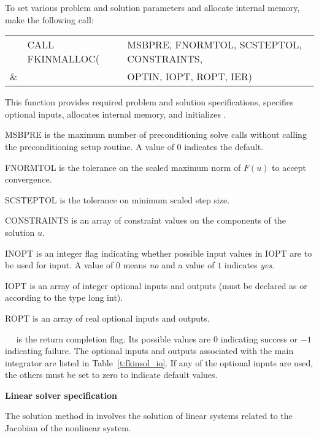 \begin{Steps}
  To set various problem and solution parameters and allocate
  internal memory, make the following call:
  {
    \begin{tabular}[t]{@{}r@{}l@{}l@{}}
      &CALL FKINMALLOC(&MSBPRE, FNORMTOL, SCSTEPTOL, CONSTRAINTS, \\
    {\&}&                &OPTIN, IOPT, ROPT, IER)
    \end{tabular}
  }
  {
    This function provides required problem and solution specifications, 
    specifies optional inputs,
    allocates internal memory, and initializes {\kinsol}.
  }
  {
    \begin{args}[CONSTRAINTS\,]
    \item[MSBPRE] is the maximum number of preconditioning solve calls
      without calling the preconditioning setup routine.
      A value of $0$ indicates the default.
    \item[FNORMTOL] is the tolerance on the scaled maximum norm of
      $F(u)$ to accept convergence. 
    \item[SCSTEPTOL] is the tolerance on minimum scaled step size.
    \item[CONSTRAINTS] is an array of constraint values on the components of the
      solution $u$.
    \item[INOPT] is an integer flag indicating whether possible
      input values in IOPT are to be used for input. A value of
      $0$ means {\em no} and a value of $1$ indicates {\em yes}.
    \item[IOPT] is an array of integer optional inputs and outputs
      (must be declared as  or  according to the
      {\C} type long int).
    \item[ROPT] is an array of real optional inputs and outputs.
    \end{args}
  }
  {
    ~~ is the return completion flag. Its possible values are $0$ 
    indicating success or $-1$ indicating failure.
  }
  {
    The optional inputs and outputs associated with the main {\kinsol} integrator
    are listed in Table~\ref{t:fkinsol_io}.
    If any of the optional inputs are used, the others must be set
    to zero to indicate default values.
  }
  
\item\label{i:fkinsol_lin_solv_spec}{\bf Linear solver specification} 
  
  The solution method in {\kinsol} involves the solution of linear systems 
  related to the Jacobian of the nonlinear system.
  

\end{Steps}
